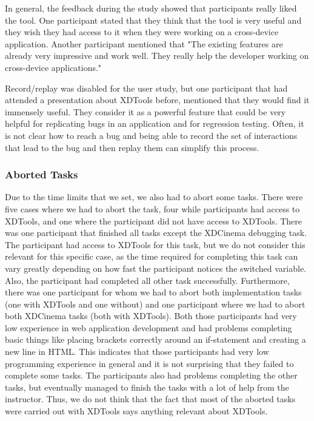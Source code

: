 In general, the feedback during the study showed that participants really liked the tool. One participant stated that they think that the tool is very useful and they wish they had access to it when they were working on a cross-device application. Another participant mentioned that "The existing features are already very impressive and work well. They really help the developer working on cross-device applications."

Record/replay was disabled for the user study, but one participant that had attended a presentation about XDTools before, mentioned that they would find it immensely useful. They consider it as a powerful feature that could be very helpful for replicating bugs in an application and for regression testing. Often, it is not clear how to reach a bug and being able to record the set of interactions that lead to the bug and then replay them can simplify this process.

\subsubsection{Aborted Tasks}

Due to the time limits that we set, we also had to abort some tasks. There were five cases where we had to abort the task, four while participants had access to XDTools, and one where the participant did not have access to XDTools. There was one participant that finished all tasks except the XDCinema debugging task. The participant had access to XDTools for this task, but we do not consider this relevant for this specific case, as the time required for completing this task can vary greatly depending on how fast the participant notices the switched variable. Also, the participant had completed all other task successfully. Furthermore, there was one participant for whom we had to abort both implementation tasks (one with XDTools and one without) and one participant where we had to abort both XDCinema tasks (both with XDTools). Both those participants had very low experience in web application development and had problems completing basic things like placing brackets correctly around an if-statement and creating a new line in HTML. This indicates that those participants had very low programming experience in general and it is not surprising that they failed to complete some tasks. The participants also had problems completing the other tasks, but eventually managed to finish the tasks with a lot of help from the instructor. Thus, we do not think that the fact that most of the aborted tasks were carried out with XDTools says anything relevant about XDTools. 

